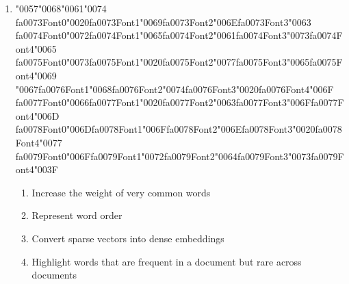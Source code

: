 \documentclass[12pt]{article}
\begin{document}
\begin{enumerate}[label=Q\arabic*.]
\item {\char"0057}{\char"0068}{\char"0061}{\char"0074} {\csname fa0073Font0\endcsname\char"0020}{\csname fa0073Font1\endcsname\char"0069}{\csname fa0073Font2\endcsname\char"006E}{\csname fa0073Font3\endcsname\char"0063} {\csname fa0074Font0\endcsname\char"0072}{\csname fa0074Font1\endcsname\char"0065}{\csname fa0074Font2\endcsname\char"0061}{\csname fa0074Font3\endcsname\char"0073}{\csname fa0074Font4\endcsname\char"0065} {\csname fa0075Font0\endcsname\char"0073}{\csname fa0075Font1\endcsname\char"0020}{\csname fa0075Font2\endcsname\char"0077}{\csname fa0075Font3\endcsname\char"0065}{\csname fa0075Font4\endcsname\char"0069} {\char"0067}{\csname fa0076Font1\endcsname\char"0068}{\csname fa0076Font2\endcsname\char"0074}{\csname fa0076Font3\endcsname\char"0020}{\csname fa0076Font4\endcsname\char"006F} {\csname fa0077Font0\endcsname\char"0066}{\csname fa0077Font1\endcsname\char"0020}{\csname fa0077Font2\endcsname\char"0063}{\csname fa0077Font3\endcsname\char"006F}{\csname fa0077Font4\endcsname\char"006D} {\csname fa0078Font0\endcsname\char"006D}{\csname fa0078Font1\endcsname\char"006F}{\csname fa0078Font2\endcsname\char"006E}{\csname fa0078Font3\endcsname\char"0020}{\csname fa0078Font4\endcsname\char"0077} {\csname fa0079Font0\endcsname\char"006F}{\csname fa0079Font1\endcsname\char"0072}{\csname fa0079Font2\endcsname\char"0064}{\csname fa0079Font3\endcsname\char"0073}{\csname fa0079Font4\endcsname\char"003F}
\begin{enumerate}[label=(\Alph*)]
    \item Increase the weight of very common words
    \item Represent word order
    \item Convert sparse vectors into dense embeddings
    \item Highlight words that are frequent in a document but rare across documents
\end{enumerate}

\end{enumerate}
\end{document}
